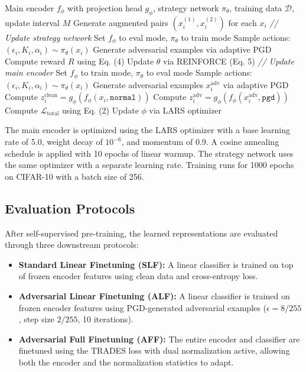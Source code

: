 \documentclass[conference]{IEEEtran}
\begin{document}
\begin{algorithm}
\caption{ASTrA Training Procedure}
\begin{algorithmic}[1]
\REQUIRE Main encoder $f_\phi$ with projection head $g_\phi$, strategy network $\pi_\theta$, training data $\mathcal{D}$, update interval $M$
\STATE Generate augmented pairs $(x_i^{(1)}, x_i^{(2)})$ for each $x_i$
    \STATE \textit{// Update strategy network}
    \STATE Set $f_\phi$ to eval mode, $\pi_\theta$ to train mode
    \STATE Sample actions: $(\epsilon_i, K_i, \alpha_i) \sim \pi_\theta(x_i)$
    \STATE Generate adversarial examples via adaptive PGD
    \STATE Compute reward $R$ using Eq. (4)
    \STATE Update $\theta$ via REINFORCE (Eq. 5)
\ENDIF
\STATE \textit{// Update main encoder}
\STATE Set $f_\phi$ to train mode, $\pi_\theta$ to eval mode
\STATE Sample actions: $(\epsilon_i, K_i, \alpha_i) \sim \pi_\theta(x_i)$
\STATE Generate adversarial examples $x_i^{\text{adv}}$ via adaptive PGD
\STATE Compute $z_i^{\text{clean}} = g_\phi(f_\phi(x_i, \texttt{normal}))$
\STATE Compute $z_i^{\text{adv}} = g_\phi(f_\phi(x_i^{\text{adv}}, \texttt{pgd}))$
\STATE Compute $\mathcal{L}_{\text{total}}$ using Eq. (2)
\STATE Update $\phi$ via LARS optimizer
\ENDFOR
\ENDFOR
\end{algorithmic}
\end{algorithm}

The main encoder is optimized using the LARS optimizer with a base learning rate of 5.0, weight decay of $10^{-6}$, and momentum of 0.9. A cosine annealing schedule is applied with 10 epochs of linear warmup. The strategy network uses the same optimizer with a separate learning rate. Training runs for 1000 epochs on CIFAR-10 with a batch size of 256.

\subsection{Evaluation Protocols}

After self-supervised pre-training, the learned representations are evaluated through three downstream protocols:

\begin{itemize}
    \item \textbf{Standard Linear Finetuning (SLF):} A linear classifier is trained on top of frozen encoder features using clean data and cross-entropy loss.

    \item \textbf{Adversarial Linear Finetuning (ALF):} A linear classifier is trained on frozen encoder features using PGD-generated adversarial examples ($\epsilon = 8/255$, step size $2/255$, 10 iterations).

    \item \textbf{Adversarial Full Finetuning (AFF):} The entire encoder and classifier are finetuned using the TRADES loss with dual normalization active, allowing both the encoder and the normalization statistics to adapt.
\end{itemize}
\end{document}
